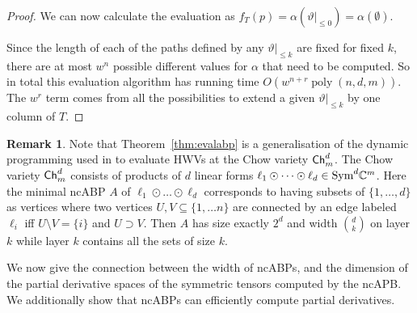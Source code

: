 \documentclass[10pt,a4paper]{article}
\numberwithin{equation}{section}
\theoremstyle{definition}
\newtheorem{remark}[equation]{Remark}
\newcommand{\Sym}{\textup{Sym}}
\newcommand{\IC}{\mathbb{C}}
\newcommand{\Ch}{\textup{\textsf{Ch}}}
\DeclareMathOperator{\poly}{poly}
\begin{document}
\begin{proof}
We can now calculate the evaluation as $
    f_T(p) = \alpha(\vartheta|_{\leq 0}) = \alpha(\emptyset).
$

Since the length of each of the paths defined by any $\vartheta|_{\leq k}$ are fixed for fixed $k$, there are at most $w^n$ possible different values for $\alpha$ that need to be computed.
So in total this evaluation algorithm has running time $O(w^{n+r} \poly(n,d,m))$.
The $w^{r}$ term comes from all the possibilities to extend a given $\vartheta|_{\leq k}$ by one column of $T$.
\end{proof}

\begin{remark}
    Note that Theorem~\ref{thm:evalabp} is a generalisation of the dynamic programming used in \cite{DBLP:conf/icalp/DorflerIP19} to evaluate HWVs at the Chow variety $\Ch^d_m$.
    The Chow variety $\Ch^d_m$ consists of products of $d$ linear forms $\ell_1 \odot \dots \odot \ell_d \in \Sym^d \IC^m$.
    Here the minimal ncABP $A$ of $\ell_1 \odot \dots \odot \ell_d$ corresponds to having subsets of $\{1, \ldots, d\}$ as vertices where two vertices $U, V \subseteq \{1, \ldots n\}$ are connected by an edge labeled $\ell_i$ iff $U \setminus V = \{i\}$ and $U \supset V$.
    Then $A$ has size exactly $2^d$ and width $\binom{d}{k}$ on layer $k$ while layer $k$ contains all the sets of size $k$.
\end{remark}

We now give the connection between the width of ncABPs, and the dimension of the partial derivative spaces of the symmetric tensors computed by the ncAPB.
We additionally show that ncABPs can efficiently compute partial derivatives.
\end{document}
